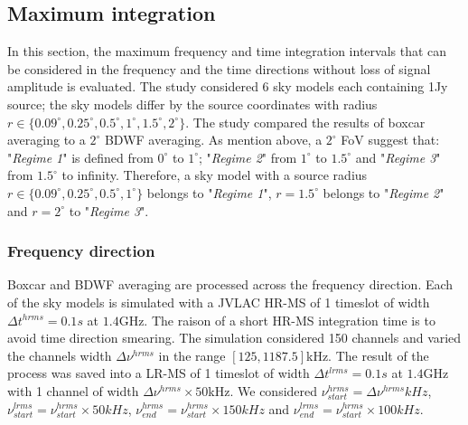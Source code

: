 \documentclass[useAMS,usenatbib]{mn2e}
\begin{document}
% 
\subsection{Maximum integration}
In this section, the maximum frequency and time integration intervals  that can be 
considered in the frequency and the time 
directions without loss of signal amplitude is evaluated. The study considered $6$ sky 
models each  containing 1Jy source; the sky models differ by the source 
coordinates with radius $r\in\{0.09^\circ,0.25^\circ,0.5^\circ,1^\circ,1.5^\circ, 2^\circ\}$. The study compared the results of  boxcar 
averaging to a $2^\circ$ BDWF averaging. As mention above, a $2^{\circ}$ FoV suggest that: "\textit{Regime 1}" 
is defined from $0^\circ$ to $1^\circ$; "\textit{Regime 2}" from $1^\circ$ to $1.5^\circ$ and "\textit{Regime 3}" from $1.5^\circ$ to 
infinity. Therefore, a sky model with a source radius $r\in\{0.09^\circ,0.25^\circ,0.5^\circ,1^\circ\}$ belongs to "\textit{Regime 1}", 
$r= 1.5^\circ$ belongs to  "\textit{Regime 2}" and $r=2^\circ$ to "\textit{Regime 3}".
\subsubsection{Frequency direction}
Boxcar and BDWF averaging are processed across the frequency direction.
Each of the sky models is simulated with a JVLAC HR-MS of 1 timeslot of width $\Delta t^{hrms}=0.1s$ at $1.4$GHz. The raison of a short 
HR-MS 
integration time is to avoid time direction smearing. The simulation considered 150 channels and varied the channels width $\Delta 
\nu^{hrms}$ in the range $[125,1187.5]$kHz. The result of the process was saved into a LR-MS of 1 timeslot of width $\Delta 
t^{lrms}=0.1s$ at $1.4$GHz with 1 
channel of width $\Delta \nu^{hrms}\times50$kHz. We considered $\nu^{hrms}_{start}=\Delta \nu^{hrms}kHz$, 
$\nu^{lrms}_{start}=\nu^{hrms}_{start}\times50 kHz$, $\nu^{hrms}_{end}=\nu^{hrms}_{start}\times150 kHz$ and 
$\nu^{lrms}_{end}=\nu^{hrms}_{start}\times100 kHz$.
\end{document}
